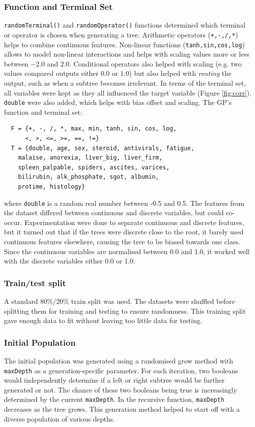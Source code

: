 \documentclass{article}
\begin{document}
\subsubsection{Function and Terminal Set}
\texttt{randomTerminal()} and \texttt{randomOperator()} functions determined which terminal or operator is chosen when generating a tree. Arithmetic operators (\texttt{+,-,/,*}) helps to combine continuous features. Non-linear functions (\texttt{tanh,sin,cos,log}) allows to model non-linear interactions and helps with scaling values more or less between \(-2.0\) and \(2.0\). Conditional operators also helped with scaling (e.g. two values compared outputs either \(0.0\) or \(1.0\)) but also helped with \emph{routing} the output, such as when a subtree becomes irrelevant.
In terms of the terminal set, all variables were kept as they all influenced the target variable (Figure \ref{fig:corr}). \texttt{double} were also added, which helps with bias offset and scaling. The GP's function and terminal set:
\begin{verbatim}
  F = {+, -, /, *, max, min, tanh, sin, cos, log, 
      <, >, <=, >=, ==, !=}
  T = {double, age, sex, steroid, antivirals, fatigue,
    malaise, anorexia, liver_big, liver_firm,
    spleen_palpable, spiders, ascites, varices,
    bilirubin, alk_phosphate, sgot, albumin,
    protime, histology}
\end{verbatim}
where \texttt{double} is a random real number between -0.5 and 0.5. The features from the dataset differed between continuous and discrete variables, but could co-occur. Experimentation were done to separate continuous and discrete features, but it turned out that if the trees were discrete close to the root, it barely used continuous features elsewhere, causing the tree to be biased towards one class. Since the continuous variables are normalised between 0.0 and 1.0, it worked well with the discrete variables either 0.0 or 1.0.

\subsubsection{Train/test split}
A standard 80\%/20\% train split was used. The datasets were shuffled before splitting them for training and testing to ensure randomness. This training split gave enough data to fit without leaving too little data for testing.

\subsubsection{Initial Population}
\label{initPop}
The initial population was generated using a randomised grow method with \texttt{maxDepth} as a generation-specific parameter. For each iteration, two booleans would independently determine if a left or right subtree would be further generated or not. The chance of these two booleans being true is increasingly determined by the current \texttt{maxDepth}. In the recursive function, \texttt{maxDepth} decreases as the tree grows. This generation method helped to start off with a diverse population of various depths.
\end{document}
